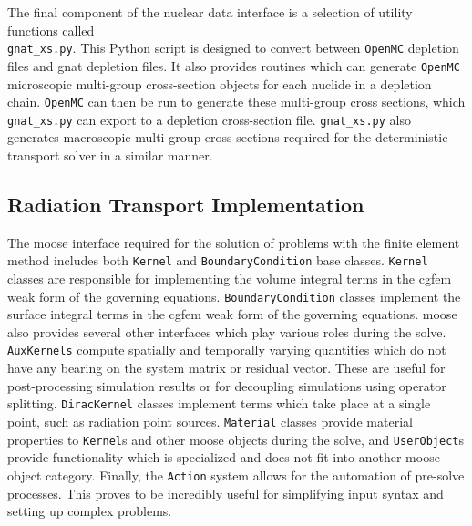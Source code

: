The final component of the nuclear data interface is a selection of utility functions called \\\texttt{gnat\_xs.py}. This Python script is designed to convert between \texttt{OpenMC} depletion files and \acrshort{gnat} depletion files. It also provides routines which can generate \texttt{OpenMC} microscopic multi-group cross-section objects for each nuclide in a depletion chain. \texttt{OpenMC} can then be run to generate these multi-group cross sections, which \texttt{gnat\_xs.py} can export to a depletion cross-section file. \texttt{gnat\_xs.py} also generates macroscopic multi-group cross sections required for the deterministic transport solver in a similar manner.

\subsection{Radiation Transport Implementation}
\label{solver:implementation:radiation_transport}

The \acrshort{moose} interface required for the solution of problems with the finite element method includes both \texttt{Kernel} and \texttt{BoundaryCondition} base classes. \texttt{Kernel} classes are responsible for implementing the volume integral terms in the \acrshort{cgfem} weak form of the governing equations. \texttt{BoundaryCondition} classes implement the surface integral terms in the \acrshort{cgfem} weak form of the governing equations. \acrshort{moose} also provides several other interfaces which play various roles during the solve. \texttt{AuxKernels} compute spatially and temporally varying quantities which do not have any bearing on the system matrix or residual vector. These are useful for post-processing simulation results or for decoupling simulations using operator splitting. \texttt{DiracKernel} classes implement terms which take place at a single point, such as radiation point sources. \texttt{Material} classes provide material properties to \texttt{Kernel}s and other \acrshort{moose} objects during the solve, and \texttt{UserObject}s provide functionality which is specialized and does not fit into another \acrshort{moose} object category. Finally, the \texttt{Action} system allows for the automation of pre-solve processes. This proves to be incredibly useful for simplifying input syntax and setting up complex problems.

